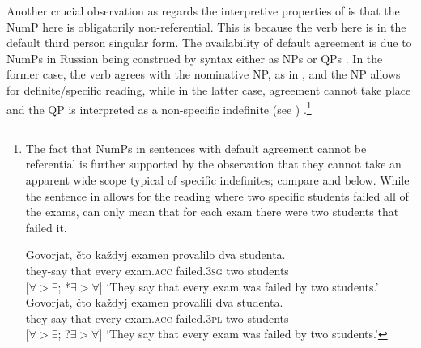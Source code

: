 \documentclass[output=paper,
modfonts,
newtxmath,
hidelinks
]{langscibook}
\begin{document}
Another crucial observation as regards the interpretive properties of  is that the NumP here is obligatorily non-referential. This is because the verb here is in the default third person singular form. The availability of default agreement is due to NumPs in Russian being construed by syntax either as NPs or QPs \citep{Pesetsky1982}. In the former case, the verb agrees with the nominative NP, as in , and the NP allows for definite/specific reading, while in the latter case, agreement cannot take place and the QP is interpreted as a non-specific indefinite (see ) \citep{Titov2012}.\footnote{\label{18:fn19}The fact that NumPs in sentences with default agreement cannot be referential is further supported by the observation that they cannot take an apparent wide scope typical of specific indefinites; compare  and  below. While the sentence in  allows for the reading where two specific students failed all of the exams,  can only mean that for each exam there were two students that failed it.   

\ea \label{18:fn19i}
\gll Govorjat, čto každyj examen provalilo dva studenta. \\
	 they-say  that  every  exam.\textsc{acc}  failed.\textsc{3sg}  two   students \\\hfill [$\forall > \exists$; *$\exists > \forall$]
\glt `They say that every exam was failed by two students.'  
\z
\ea \label{18:fn19ii}
\gll Govorjat, čto každyj examen provalili dva studenta. \\ 
	 they-say  that  every  exam.\textsc{acc}  failed.\textsc{3pl}  two   students  \\\hfill [$\forall > \exists$; ?$\exists > \forall$]
\glt `They say that every exam was failed by two students.'
\z
}  
\ea \label{18:ex23}
	\z
\z           
\end{document}
